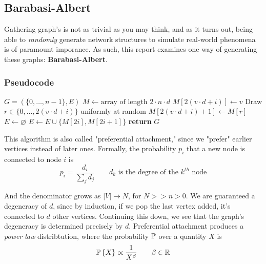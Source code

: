 \documentclass[11pt]{article}
\begin{document}
\subsection{Barabasi-Albert}
Gathering graph's is not as trivial as you may think, and as it turns out, being
able to \textit{randomly} generate network structures to simulate real-world
phenomena is of paramount imporance. As such, this report examines one way of 
generating these graphs: \textbf{Barabasi-Albert}. 


\subsubsection{Pseudocode}
\begin{algorithm}[H]
    \caption{Barabási-Albert (Preferential Attachment)}\label{alg:pa}
    \begin{algorithmic}[1] %
        \State $G = (\{0, \dots, n - 1\}, E)$
        \State $M \gets \text{array of length } 2 \cdot n \cdot d$
                \State $M[2(v \cdot d + i)] \gets v$
                \State Draw $r \in \{0, \dots, 2(v \cdot d + i)\}$ uniformly at random
                \State $M[2(v \cdot d + i) + 1] \gets M[r]$
            \EndFor
        \EndFor
        \State $E \gets \varnothing$
            \State $E \gets E \cup \{M[2i], M[2i + 1]\}$
        \EndFor
        \State \textbf{return} $G$
        \EndProcedure
    \end{algorithmic}
\end{algorithm}

This algorithm is also called "preferential attachment," since we "prefer" earlier
vertices instead of later ones. Formally, the probability $p_i$ that a new node 
is connected to node $i$ is
\begin{equation*}
	p_i = \frac{d_i}{\sum_j d_j} \qquad d_k \text{ is the degree of the 
	$k^{th}$ node} 
\end{equation*}

And the denominator grows as $|V| \rightarrow N$, for $N >> n > 0$. We are guaranteed a degeneracy of $d$, since by  induction, if we pop the last vertex added, 
it's connected to $d$ other vertices. Continuing this down, we see that the graph's 
degeneracy is determined precisely by $d$. Preferential attachment produces a 
\textit{power law} distribtution, where the probability $\mathbb{P}$ over a quantity $X$ 
is
\begin{equation*}
	\mathbb{P} \left\{ X \right\} \propto \frac{1}{X^\beta} \qquad \beta \in \mathbb{R}
\end{equation*}
\newpage
\end{document}
